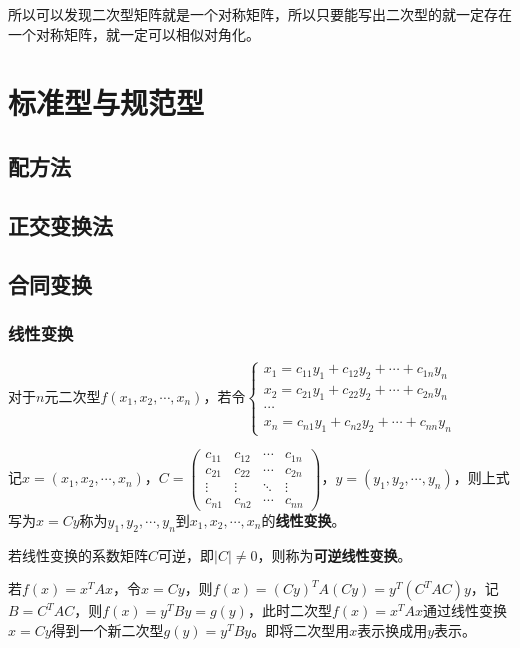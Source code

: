 \documentclass[UTF8, 12pt]{ctexart}
\begin{document}
所以可以发现二次型矩阵就是一个对称矩阵，所以只要能写出二次型的就一定存在一个对称矩阵，就一定可以相似对角化。

\section{标准型与规范型}

\subsection{配方法}

\subsection{正交变换法}

\subsection{合同变换}

\subsubsection{线性变换}

对于$n$元二次型$f(x_1,x_2,\cdots,x_n)$，若令$\left\{\begin{array}{l}
    x_1=c_{11}y_1+c_{12}y_2+\cdots+c_{1n}y_n \\
    x_2=c_{21}y_1+c_{22}y_2+\cdots+c_{2n}y_n \\
    \cdots \\
    x_n=c_{n1}y_1+c_{n2}y_2+\cdots+c_{nn}y_n
\end{array}\right.$

记$x=(x_1,x_2,\cdots,x_n)$，$C=\left(\begin{array}{cccc}
    c_{11} & c_{12} & \cdots & c_{1n} \\
    c_{21} & c_{22} & \cdots & c_{2n} \\
    \vdots & \vdots & \ddots & \vdots \\
    c_{n1} & c_{n2} & \cdots & c_{nn}
\end{array}\right)$，$y=(y_1,y_2,\cdots,y_n)$，则上式写为$x=Cy$称为$y_1,y_2,\cdots,y_n$到$x_1,x_2,\cdots,x_n$的\textbf{线性变换}。

若线性变换的系数矩阵$C$可逆，即$\vert C\vert\neq0$，则称为\textbf{可逆线性变换}。

若$f(x)=x^TAx$，令$x=Cy$，则$f(x)=(Cy)^TA(Cy)=y^T(C^TAC)y$，记$B=C^TAC$，则$f(x)=y^TBy=g(y)$，此时二次型$f(x)=x^TAx$通过线性变换$x=Cy$得到一个新二次型$g(y)=y^TBy$。即将二次型用$x$表示换成用$y$表示。
\end{document}

